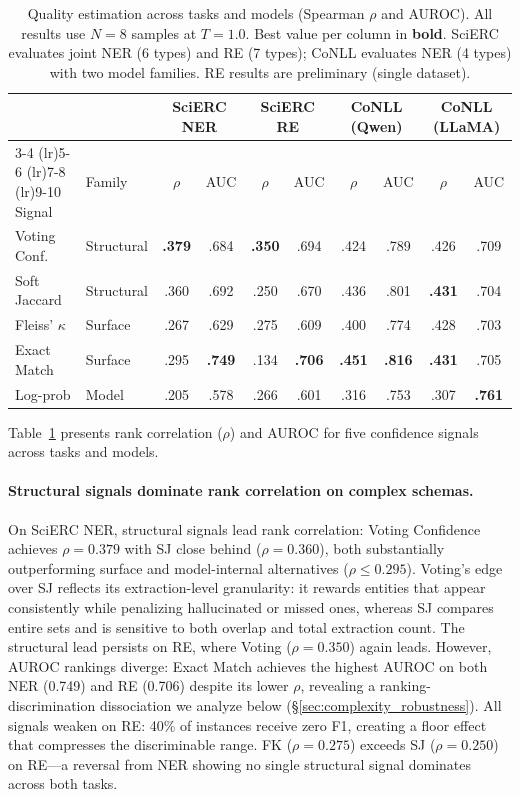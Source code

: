 \begin{table}[t]
\centering
\small
\caption{Quality estimation across tasks and models (Spearman $\rho$ and AUROC). All results use $N{=}8$ samples at $T{=}1.0$. Best value per column in \textbf{bold}. SciERC evaluates joint NER (6 types) and RE (7 types); CoNLL evaluates NER (4 types) with two model families. RE results are preliminary (single dataset).}
\label{tab:quality_estimation}
\begin{tabular}{ll cc cc cc cc}
\toprule
& & \multicolumn{2}{c}{\textbf{SciERC NER}} & \multicolumn{2}{c}{\textbf{SciERC RE}} & \multicolumn{2}{c}{\textbf{CoNLL (Qwen)}} & \multicolumn{2}{c}{\textbf{CoNLL (LLaMA)}} \\
\cmidrule(lr){3-4} \cmidrule(lr){5-6} \cmidrule(lr){7-8} \cmidrule(lr){9-10}
Signal & Family & $\rho$ & AUC & $\rho$ & AUC & $\rho$ & AUC & $\rho$ & AUC \\
\midrule
Voting Conf. & Structural & \textbf{.379} & .684 & \textbf{.350} & .694 & .424 & .789 & .426 & .709 \\
Soft Jaccard  & Structural & .360 & .692 & .250 & .670 & .436 & .801 & \textbf{.431} & .704 \\
Fleiss' $\kappa$ & Surface & .267 & .629 & .275 & .609 & .400 & .774 & .428 & .703 \\
Exact Match  & Surface    & .295 & \textbf{.749} & .134 & \textbf{.706} & \textbf{.451} & \textbf{.816} & \textbf{.431} & .705 \\
Log-prob     & Model      & .205 & .578 & .266 & .601 & .316 & .753 & .307 & \textbf{.761} \\
\bottomrule
\end{tabular}
\end{table}

Table~\ref{tab:quality_estimation} presents rank correlation ($\rho$) and AUROC for five confidence signals across tasks and models.

\paragraph{Structural signals dominate rank correlation on complex schemas.}
On SciERC NER, structural signals lead rank correlation: Voting Confidence achieves $\rho{=}0.379$ with SJ close behind ($\rho{=}0.360$), both substantially outperforming surface and model-internal alternatives ($\rho{\leq}0.295$).
Voting's edge over SJ reflects its extraction-level granularity: it rewards entities that appear consistently while penalizing hallucinated or missed ones, whereas SJ compares entire sets and is sensitive to both overlap and total extraction count.
The structural lead persists on RE, where Voting ($\rho{=}0.350$) again leads.
However, AUROC rankings diverge: Exact Match achieves the highest AUROC on both NER (0.749) and RE (0.706) despite its lower $\rho$, revealing a ranking-discrimination dissociation we analyze below (\S\ref{sec:complexity_robustness}).
All signals weaken on RE: 40\% of instances receive zero F1, creating a floor effect that compresses the discriminable range.
FK ($\rho{=}0.275$) exceeds SJ ($\rho{=}0.250$) on RE---a reversal from NER showing no single structural signal dominates across both tasks.

